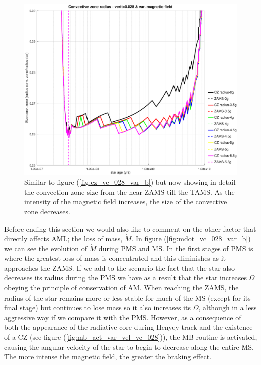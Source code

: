 \documentclass[fleqn,usenatbib]{mnras}
\begin{document}
\begin{figure}
	\includegraphics[trim = 30mm 15mm 20mm 15mm, clip,width=\columnwidth]{figures/cz_vc_028_var_g_z1.eps}
    \caption{Similar to figure (\ref{fig:cz_vc_028_var_b}) but now showing in detail the convection zone size from the near ZAMS till the TAMS. As the intensity of the magnetic field increases, the size of the convective zone decreases.}
    \label{fig:cz_vc_028_var_b_z1}
\end{figure}

Before ending this section we would also like to comment on the other factor that directly affects AML; the loss of mass, $\Dot{M}$. In figure (\ref{fig:mdot_vc_028_var_b}) we can see the evolution of $\Dot{M}$ during PMS and MS. In the first stages of PMS is where the greatest loss of mass is concentrated and this diminishes as it approaches the ZAMS. If we add to the scenario the fact that the star also decreases its radius during the PMS we have as a result that the star increases $\Omega$ obeying the principle of conservation of AM. When reaching the ZAMS, the radius of the star remains more or less stable for much of the MS (except for its final stage) but continues to lose mass so it also increases its $\Omega$, although in a less aggressive way if we compare it with the PMS. However, as a consequence of both the appearance of the radiative core during Henyey track and the existence of a CZ (see figure (\ref{fig:mb_act_var_vel_vc_028})), the MB routine is activated, causing the angular velocity of the star to begin to decrease along the entire MS. The more intense the magnetic field, the greater the braking effect.\par 
\end{document}
